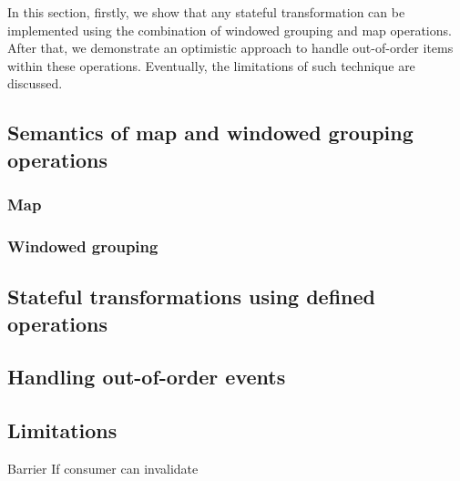 
\label {fs-optimistic}

In this section, firstly, we show that any stateful transformation can be implemented using the combination of windowed grouping and map operations. After that, we demonstrate an optimistic approach to handle out-of-order items within these operations. Eventually, the limitations of such technique are discussed.

\subsection{Semantics of map and windowed grouping operations}

\subsubsection{Map}

\subsubsection{Windowed grouping}

\subsection{Stateful transformations using defined operations}

\subsection{Handling out-of-order events}

\subsection{Limitations}

Barrier
If consumer can invalidate 



